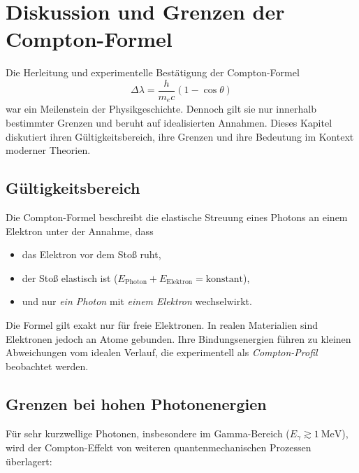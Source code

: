 \section{Diskussion und Grenzen der Compton-Formel}

Die Herleitung und experimentelle Bestätigung der Compton-Formel
\[
\Delta \lambda = \frac{h}{m_e c}(1 - \cos\theta)
\]
war ein Meilenstein der Physikgeschichte. Dennoch gilt sie nur innerhalb bestimmter Grenzen
und beruht auf idealisierten Annahmen. Dieses Kapitel diskutiert ihren Gültigkeitsbereich,
ihre Grenzen und ihre Bedeutung im Kontext moderner Theorien.

\subsection{Gültigkeitsbereich}

Die Compton-Formel beschreibt die elastische Streuung eines Photons an einem Elektron unter der Annahme, dass
\begin{itemize}
	\item das Elektron vor dem Stoß ruht,
	\item der Stoß elastisch ist (\(E_\text{Photon} + E_\text{Elektron} = \text{konstant}\)),
	\item und nur \emph{ein Photon} mit \emph{einem Elektron} wechselwirkt.
\end{itemize}

\begin{PhysikBox}
	Die Formel gilt exakt nur für freie Elektronen.
	In realen Materialien sind Elektronen jedoch an Atome gebunden. 
	Ihre Bindungsenergien führen zu kleinen Abweichungen vom idealen Verlauf,
	die experimentell als \emph{Compton-Profil} beobachtet werden.
\end{PhysikBox}

\subsection{Grenzen bei hohen Photonenergien}

Für sehr kurzwellige Photonen, insbesondere im Gamma-Bereich (\(E_\gamma \gtrsim 1~\text{MeV}\)),
wird der Compton-Effekt von weiteren quantenmechanischen Prozessen überlagert:

